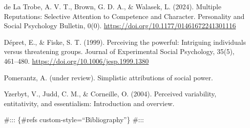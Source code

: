 \documentclass[
  doc,draftall]{apa6}
\begin{document}
de La Trobe, A. V. T., Brown, G. D. A., \& Walasek, L. (2024). Multiple Reputations: Selective Attention to Competence and Character. Personality and Social Psychology Bulletin, 0(0). \url{https://doi.org/10.1177/01461672241301116}

Dépret, E., \& Fiske, S. T. (1999). Perceiving the powerful: Intriguing individuals versus threatening groups. Journal of Experimental Social Psychology, 35(5), 461--480. \url{https://doi.org/10.1006/jesp.1999.1380}

Pomerantz, A. (under review). Simplistic attributions of social power.

Yzerbyt, V., Judd, C. M., \& Corneille, O. (2004). Perceived variability, entitativity, and essentialism: Introduction and overview.

\#::: \{\#refs custom-style=``Bibliography''\}
\#:::
\end{document}
